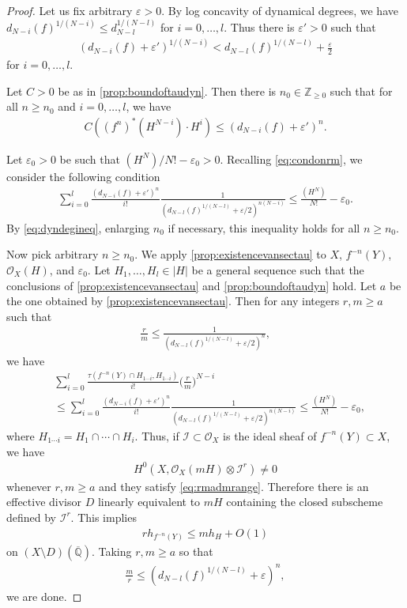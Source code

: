 \documentclass[10pt,a4paper]{amsart}
\def\I{{ \mathcal{I}}}
\def\O{{ \mathcal{O}}}
\def\QQ{\overline{\mathbb Q}}
\def\Z{{\mathbb Z}}
\newcommand{\e}{\varepsilon}
\begin{document}
\begin{proof}
Let us fix arbitrary $\e>0$.
By log concavity of dynamical degrees, we have 
$d_{N-i}(f)^{1/(N-i)} \leq d_{N-l}^{1/(N-l)}$ for $i = 0,\dots, l$.
Thus there is $\e'>0$ such that
\begin{align}
( d_{N-i}(f)+ \e' )^{1/(N-i)} <  d_{N-l}(f)^{1/(N-l)}+ \frac{\e}{2} \label{eq:dyndegineq}
\end{align}
for $i=0,\dots,l$.

Let $C > 0$ be as in \cref{prop:boundoftaudyn}.
Then there is $n_{0} \in \Z_{\geq 0}$ such that for all $n \geq n_{0}$ and $i=0,\dots,l$, we have
\begin{align}
C ((f^{n})^{*}(H^{N-i}) \cdot H^{i} )  \leq ( d_{N-i}(f)+ \e')^{n}.
\end{align}

Let $\e_{0} > 0$ be such that $(H^{N})/N! - \e_{0} > 0$. 
Recalling  \cref{eq:condonrm}, we consider the following condition
\begin{align}
\sum_{i=0}^{l} \frac{( d_{N-i}(f)+ \e')^{n}}{i!}  \frac{1}{( d_{N-l}(f)^{1/(N-l)}+ \e/2 )^{n(N-i)} } \leq \frac{(H^{N})}{N!} - \e_{0}.
\end{align}
By \cref{eq:dyndegineq},  enlarging $n_{0}$ if necessary, this inequality holds for all $n \geq n_{0}$.

Now pick arbitrary $n \geq n_{0}$.
We apply \cref{prop:existencevansectau} to $X$, $f^{-n}(Y)$, $\O_{X}(H)$, and $\e_{0}$.
Let $H_{1}, \dots, H_{l} \in |H|$ be a general sequence such that the conclusions of
\cref{prop:existencevansectau}  and \cref{prop:boundoftaudyn} hold.
Let $a$ be the one obtained by \cref{prop:existencevansectau}.
Then for any integers $r,m \geq a$ such that
\begin{align}
\frac{r}{m} \leq \frac{1}{( d_{N-l}(f)^{1/(N-l)}+ \e/2 )^{n} }, \label{eq:rmadmrange}
\end{align}
we have
\begin{align}
&\sum_{i=0}^{l} \frac{\tau(f^{-n}(Y)\cap H_{1\cdots i}, H_{1\cdots i}  )}{i!} \bigg( \frac{r}{m} \bigg)^{N-i}\\
&\leq 
\sum_{i=0}^{l} \frac{( d_{N-i}(f)+ \e')^{n}}{i!}  \frac{1}{( d_{N-l}(f)^{1/(N-l)}+ \e/2 )^{n(N-i)} } \leq \frac{(H^{N})}{N!} - \e_{0},
\end{align}
where $H_{1\cdots i} = H_{1} \cap \cdots \cap H_{i}$.
Thus, if $\I \subset \O_{X}$ is the ideal sheaf of $f^{-n}(Y) \subset X$, we have
\begin{align}
H^{0}(X, \O_{X}(mH) \otimes \I^{r}) \neq 0
\end{align}
whenever $r, m \geq a$ and they satisfy \cref{eq:rmadmrange}.
Therefore there is an effective divisor $D$ linearly equivalent to $mH$ containing 
the closed subscheme defined by $\I^{r}$.
This implies 
\begin{align}
rh_{f^{-n}(Y)} \leq mh_{H} + O(1)
\end{align}
on $(X \setminus D)(\QQ)$.
Taking $r,m \geq a$ so that 
\begin{align}
\frac{m}{r} \leq (d_{N-l}(f)^{1/(N-l)} + \e)^{n},
\end{align} 
we are done.
\end{proof}
\end{document}
